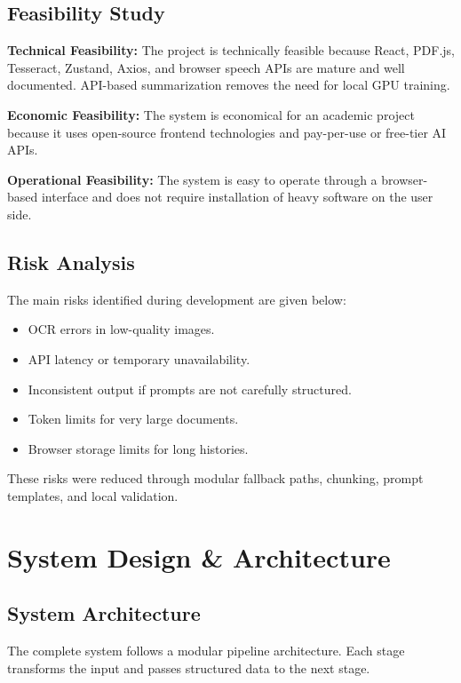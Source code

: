 \documentclass[12pt, a4paper]{report}
\begin{document}
\section{Feasibility Study}
\textbf{Technical Feasibility:} The project is technically feasible because React, PDF.js, Tesseract, Zustand, Axios, and browser speech APIs are mature and well documented. API-based summarization removes the need for local GPU training.

\textbf{Economic Feasibility:} The system is economical for an academic project because it uses open-source frontend technologies and pay-per-use or free-tier AI APIs.

\textbf{Operational Feasibility:} The system is easy to operate through a browser-based interface and does not require installation of heavy software on the user side.

\section{Risk Analysis}
The main risks identified during development are given below:
\begin{itemize}
  \item OCR errors in low-quality images.
  \item API latency or temporary unavailability.
  \item Inconsistent output if prompts are not carefully structured.
  \item Token limits for very large documents.
  \item Browser storage limits for long histories.
\end{itemize}
These risks were reduced through modular fallback paths, chunking, prompt templates, and local validation.



\chapter{System Design \& Architecture}
\section{System Architecture}
The complete system follows a modular pipeline architecture. Each stage transforms the input and passes structured data to the next stage.
\end{document}
